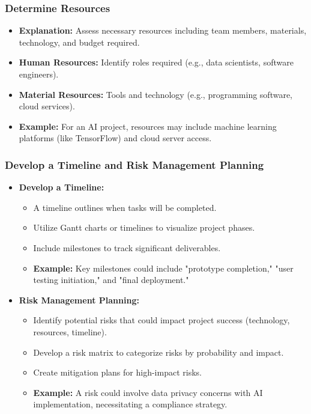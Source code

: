 \documentclass[aspectratio=169]{beamer}
\begin{document}
\begin{frame}[fragile]
    \frametitle{Determine Resources}
    \begin{itemize}
        \item \textbf{Explanation:} Assess necessary resources including team members, materials, technology, and budget required.
        \item \textbf{Human Resources:} Identify roles required (e.g., data scientists, software engineers).
        \item \textbf{Material Resources:} Tools and technology (e.g., programming software, cloud services).
        \item \textbf{Example:} For an AI project, resources may include machine learning platforms (like TensorFlow) and cloud server access.
    \end{itemize}
\end{frame}

\begin{frame}[fragile]
    \frametitle{Develop a Timeline and Risk Management Planning}
    \begin{itemize}
        \item \textbf{Develop a Timeline:}
        \begin{itemize}
            \item A timeline outlines when tasks will be completed.
            \item Utilize Gantt charts or timelines to visualize project phases.
            \item Include milestones to track significant deliverables.
            \item \textbf{Example:} Key milestones could include "prototype completion," "user testing initiation," and "final deployment."
        \end{itemize}
        
        \item \textbf{Risk Management Planning:}
        \begin{itemize}
            \item Identify potential risks that could impact project success (technology, resources, timeline).
            \item Develop a risk matrix to categorize risks by probability and impact.
            \item Create mitigation plans for high-impact risks.
            \item \textbf{Example:} A risk could involve data privacy concerns with AI implementation, necessitating a compliance strategy.
        \end{itemize}
    \end{itemize}
\end{frame}
\end{document}

